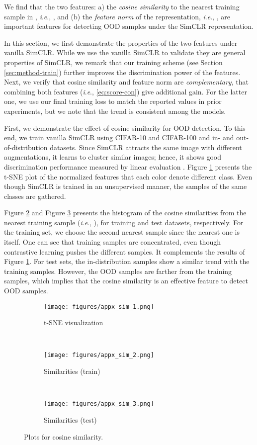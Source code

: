 \documentclass{article}
\newcommand{\ie}{\textit{i}.\textit{e}.}
\begin{document}
We find that the two features: a) the \textit{cosine similarity} to the nearest training sample in , \ie, , and (b) the \emph{feature norm} of the representation, \ie, , are important features for detecting OOD samples under the SimCLR representation.

In this section, we first demonstrate the properties of the two features under vanilla SimCLR. While we use the vanilla SimCLR to validate they are general properties of SimCLR, we remark that our training scheme (see Section \ref{sec:method-train}) further improves the discrimination power of the features. Next, we verify that cosine similarity and feature norm are \textit{complementary}, that combining both features (\ie,  \eqref{eq:score-con}) give additional gain. For the latter one, we use our final training loss to match the reported values in prior experiments, but we note that the trend is consistent among the models.

First, we demonstrate the effect of cosine similarity for OOD detection. To this end, we train vanilla SimCLR using CIFAR-10 and CIFAR-100 and in- and out-of-distribution datasets. Since SimCLR attracts the same image with different augmentations, it learns to cluster similar images; hence, it shows good discrimination performance measured by linear evaluation \citep{chen2020simple}. Figure \ref{fig:sim-1} presents the t-SNE \citep{maaten2008visualizing} plot of the normalized features that each color denote different class. Even though SimCLR is trained in an unsupervised manner, the samples of the same classes are gathered.

Figure \ref{fig:sim-2} and Figure \ref{fig:sim-3} presents the histogram of the cosine similarities from the nearest training sample (\ie, ), for training and test datasets, respectively. For the training set, we choose the second nearest sample since the nearest one is itself. One can see that training samples are concentrated, even though contrastive learning pushes the different samples. It complements the results of Figure \ref{fig:sim-1}. For test sets, the in-distribution samples show a similar trend with the training samples. However, the OOD samples are farther from the training samples, which implies that the cosine similarity is an effective feature to detect OOD samples.


\begin{figure*}[h]
\centering
\begin{subfigure}{0.32\textwidth}
\texttt{[image: figures/appx\_sim\_1.png]}
\caption{t-SNE visualization}\label{fig:sim-1}
\end{subfigure}
~\begin{subfigure}{0.32\textwidth}
\texttt{[image: figures/appx\_sim\_2.png]}
\caption{Similarities (train)}\label{fig:sim-2}
\end{subfigure}
~\begin{subfigure}{0.32\textwidth}
\texttt{[image: figures/appx\_sim\_3.png]}
\caption{Similarities (test)}\label{fig:sim-3}
\end{subfigure}
\caption{
Plots for cosine similarity.
}\label{fig:sim}
\end{figure*}
\end{document}
